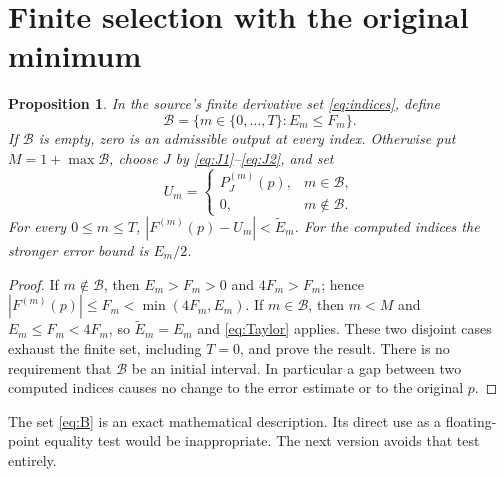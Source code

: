 \documentclass[11pt]{article}
\newtheorem{proposition}[theorem]{Proposition}
\begin{document}
\section{Finite selection with the original minimum}
\label{sec:selection}
\begin{proposition}\label{prop:finite}
In the source's finite derivative set \eqref{eq:indices}, define
\begin{equation}\label{eq:B}
\mathcal B=\{m\in\{0,\ldots,T\}: E_m\le F_m\}.
\end{equation}
If $\mathcal B$ is empty, zero is an admissible output at every
index. Otherwise put $M=1+\max\mathcal B$, choose $J$ by
\eqref{eq:J1}--\eqref{eq:J2}, and set
\begin{equation}\label{eq:output}
U_m=\begin{cases}P_J^{(m)}(p),&m\in\mathcal B,\\
0,&m\notin\mathcal B.
\end{cases}
\end{equation}
For every $0\le m\le T$,
$|F^{(m)}(p)-U_m|<\widetilde E_m$.
For the computed indices the stronger error bound is $E_m/2$.
\end{proposition}
\begin{proof}
If $m\notin\mathcal B$, then $E_m>F_m>0$ and $4F_m>F_m$;
hence $|F^{(m)}(p)|\le F_m<\min(4F_m,E_m)$.
If $m\in\mathcal B$, then $m<M$ and
$E_m\le F_m<4F_m$, so $\widetilde E_m=E_m$ and
\eqref{eq:Taylor} applies. These two disjoint cases exhaust
the finite set, including $T=0$, and prove the result.
There is no requirement that $\mathcal B$ be an initial interval.
In particular a gap between two computed indices causes no
change to the error estimate or to the original $p$.
\end{proof}

The set \eqref{eq:B} is an exact mathematical description.
Its direct use as a floating-point equality test would be
inappropriate. The next version avoids that test entirely.
\end{document}
